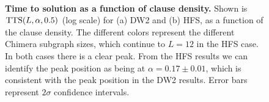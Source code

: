 \begin{figure}
\begin{center}
\\
\caption{\textbf{Time to solution as a function of clause density.} Shown is $\textrm{TTS}(L,\alpha,0.5)$ (log scale) for (a) DW2 and (b) HFS, as a function of the clause density. The different colors represent the different Chimera subgraph sizes, which continue to $L=12$ in the HFS case.  In both cases there is a clear peak. From the HFS results we can identify the peak position as being at $\alpha = 0.17\pm0.01$, which is consistent with the peak position in the DW2 results. Error bars represent $2\sigma$ confidence intervals.
}
\label{fig:DwaveVsSelby50}
\end{center}
\end{figure}

